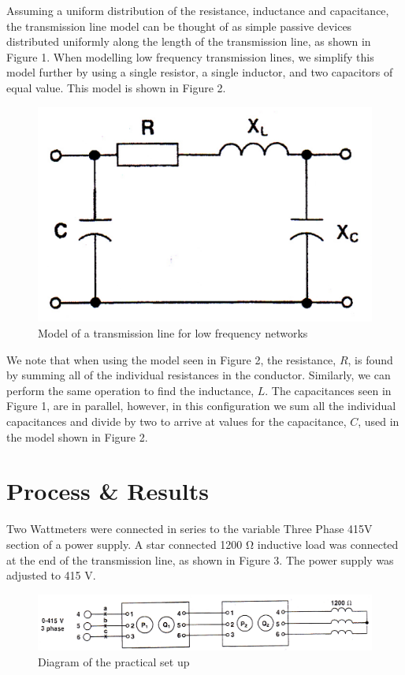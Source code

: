 \documentclass{article}
\begin{document}
Assuming a uniform distribution of the resistance, inductance and capacitance, the transmission line model can be thought of as simple passive devices distributed uniformly along the length of the transmission line, as shown in Figure 1. When modelling low frequency transmission lines, we simplify this model further by using a single resistor, a single inductor, and two capacitors of equal value. This model is shown in Figure 2.
\begin{figure}[H]
	\centering
	\includegraphics[scale=0.8]{fig2}
	\caption{Model of a transmission line for low frequency networks}
\end{figure}

We note that when using the model seen in Figure 2, the resistance, $R$, is found by summing all of the individual resistances in the conductor. Similarly, we can perform the same operation to find the inductance, $L$. The capacitances seen in Figure 1, are in parallel, however, in this configuration we sum all the individual capacitances and divide by two to arrive at values for the capacitance, $C$, used in the model shown in Figure 2.

\section{Process \& Results}

Two Wattmeters were connected in series to the variable Three Phase 415$\si{\volt}$ section of a power supply. A star connected 1200 $\si{\ohm}$ inductive load was connected at the end of the transmission line, as shown in Figure 3. The power supply was adjusted to 415 $\si{\volt}$.
\begin{figure}[H]
	\centering
	\includegraphics[scale=0.7]{fig3}
	\caption{Diagram of the practical set up}
\end{figure}
\end{document}
